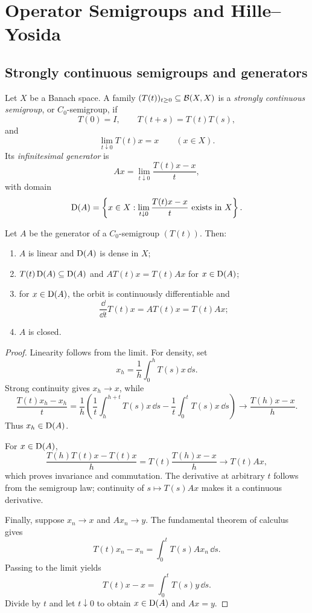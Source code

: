 \chapter{Operator Semigroups and Hille--Yosida}

\section{Strongly continuous semigroups and generators}

\begin{notedefinition}
Let $X$ be a Banach space.  A family $(T(t))_{t\ge0}\subseteq\mathcal{B}(X,X)$ is a
\emph{strongly continuous semigroup}, or $C_0$-semigroup, if
\[
  T(0)=I,
  \qquad
  T(t+s)=T(t)T(s),
\]
and
\[
  \lim_{t\downarrow0}T(t)x=x
  \qquad(x\in X).
\]
Its \emph{infinitesimal generator} is
\[
  Ax=\lim_{t\downarrow0}\frac{T(t)x-x}{t},
\]
with domain
\[
  \operatorname{D}(A)=\left\{x\in X:
       \lim_{t\downarrow0}\frac{T(t)x-x}{t}
       \text{ exists in }X\right\}.
\]
\end{notedefinition}

\begin{noteproposition}
Let $A$ be the generator of a $C_0$-semigroup $(T(t))$.  Then:
\begin{enumerate}
  \item $A$ is linear and $\operatorname{D}(A)$ is dense in $X$;
  \item $T(t)\operatorname{D}(A)\subseteq\operatorname{D}(A)$ and
        $AT(t)x=T(t)Ax$ for $x\in\operatorname{D}(A)$;
  \item for $x\in\operatorname{D}(A)$, the orbit is continuously differentiable and
        \[
          \frac{\dd}{\dd t}T(t)x=AT(t)x=T(t)Ax;
        \]
  \item $A$ is closed.
\end{enumerate}
\end{noteproposition}

\begin{proof}
Linearity follows from the limit.  For density, set
\[
  x_h=\frac1h\int_0^hT(s)x\,\dd s.
\]
Strong continuity gives $x_h\to x$, while
\[
  \frac{T(t)x_h-x_h}{t}
  =\frac1h\left(
       \frac1t\int_h^{h+t}T(s)x\,\dd s
       -\frac1t\int_0^tT(s)x\,\dd s
    \right)
  \longrightarrow\frac{T(h)x-x}{h}.
\]
Thus $x_h\in\operatorname{D}(A)$.

For $x\in\operatorname{D}(A)$,
\[
 \frac{T(h)T(t)x-T(t)x}{h}
 =T(t)\frac{T(h)x-x}{h}\longrightarrow T(t)Ax,
\]
which proves invariance and commutation.  The derivative at arbitrary $t$
follows from the semigroup law; continuity of $s\mapsto T(s)Ax$ makes it a
continuous derivative.

Finally, suppose $x_n\to x$ and $Ax_n\to y$.  The fundamental theorem of
calculus gives
\[
  T(t)x_n-x_n=\int_0^tT(s)Ax_n\,\dd s.
\]
Passing to the limit yields
\[
  T(t)x-x=\int_0^tT(s)y\,\dd s.
\]
Divide by $t$ and let $t\downarrow0$ to obtain $x\in\operatorname{D}(A)$ and $Ax=y$.
\end{proof}

